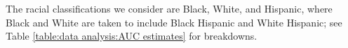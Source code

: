 \documentclass[12pt]{article}
\begin{document}



The racial classifications we consider are Black, White, and Hispanic,
where Black and White are taken to include Black Hispanic and White
Hispanic; see Table \ref{table:data analysis:AUC estimates} for breakdowns.
\end{document}
